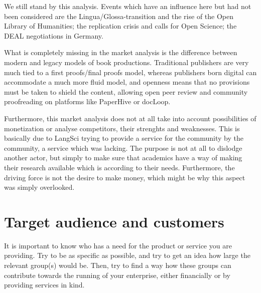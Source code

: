 \documentclass[output=guidelines,nonflat,smallfont,
draftmode
]{langsci/langscibook}
\newcommand{\background}[1]{ 
  \vspace{5mm}
  \renewcommand{\tblslinecolour}{lsDarkBlue}
  \tblssy[red]{explore2}{Background}{\vspace*{-5mm}#1}
}
\newcommand{\evaluation}[1]{
  \renewcommand{\tblslinecolour}{lsLightOrange}
  \tblssy{receipt}{Evaluation}{\vspace*{-5mm}#1}
}
\newcommand{\othersolutions}[1]{
  \renewcommand{\tblslinecolour}{lsDarkGreenOne}
  \tblssy{more}{Other solutions}{\vspace*{-5mm}#1}
}
\renewcommand{\tblssy}[4][black!12]{%
  \renewcommand{\langscisymbol}{#2}\renewcommand{\tblsboxcolor}{#1}
  \begin{mdframed}[style=yellowexercise,frametitle={#3}]
    #4
  \end{mdframed}
}
\begin{document}
\evaluation{
We still stand by this analysis. Events which have an influence here but had not been considered are the Lingua/Glossa-transition and the rise of the Open Library of Humanities; the replication crisis and calls for Open Science; the DEAL negotiations in Germany.  
}
\othersolutions{
What is completely missing in the market analysis is the difference between modern and legacy models of book productions. Traditional publishers are very much tied to a first proofs/final proofs model, whereas publishers born digital can accommodate a much more fluid model, and openness means that no provisions must be taken to shield the content, allowing open peer review and community proofreading on platforms like PaperHive or docLoop.

Furthermore, this market analysis does not at all take into account possibilities of monetization or analyse competitors, their strenghts and weaknesses.%
This is basically due to LangSci trying to provide a service for the community by the community, a service which was lacking. The purpose is not at all to dislodge another actor, but simply to make sure that academics have a way of making their research available which is according to their needs. Furthermore, the driving force is not the desire to make money, which might be why this aspect was simply overlooked.
}
 
\section{Target audience and customers}

\background{It is important to know who has a need for the product or service you are providing. Try to be as specific as possible, and try to get an idea how large the relevant group(s) would be. Then, try to find a way how these groups can contribute towards the running of your enterprise, either financially or by providing services in kind.
}
\end{document}
